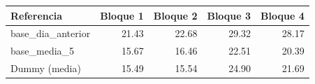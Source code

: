 \begin{tabular}{lrrrr}
\toprule
Referencia & Bloque 1 & Bloque 2 & Bloque 3 & Bloque 4 \\
\midrule
base\_dia\_anterior & 21.43 & 22.68 & 29.32 & 28.17 \\
base\_media\_5 & 15.67 & 16.46 & 22.51 & 20.39 \\
Dummy (media) & 15.49 & 15.54 & 24.90 & 21.69 \\
\bottomrule
\end{tabular}
